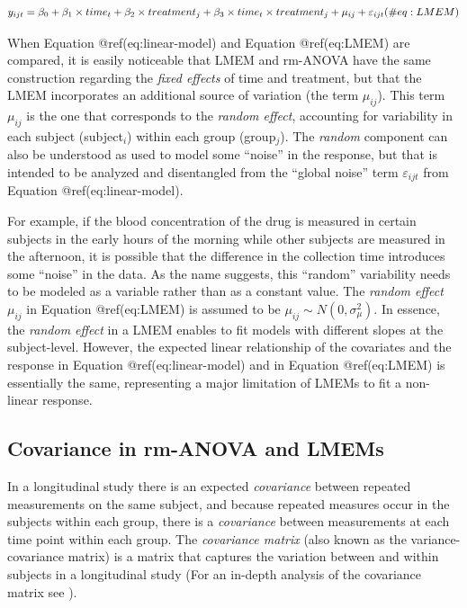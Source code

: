 \documentclass[Royal,times,sagev]{sagej}
\begin{document}
\begin{equation}
y_{ijt} = \beta_0+ \beta_1 \times time_{t} + \beta_2 \times treatment_{j} + \beta_3 \times time_{t}\times treatment_{j}+\mu_{ij} +\varepsilon_{ijt}\\ 
(\#eq:LMEM)
\end{equation}

When Equation @ref(eq:linear-model) and Equation @ref(eq:LMEM) are
compared, it is easily noticeable that LMEM and rm-ANOVA have the same
construction regarding the \emph{fixed effects} of time and treatment,
but that the LMEM incorporates an additional source of variation (the
term \(\mu_{ij}\)). This term \(\mu_{ij}\) is the one that corresponds
to the \emph{random effect}, accounting for variability in each subject
(subject\(_i\)) within each group (group\(_j\)). The \emph{random}
component can also be understood as used to model some ``noise'' in the
response, but that is intended to be analyzed and disentangled from the
``global noise'' term \(\varepsilon_{ijt}\) from Equation
@ref(eq:linear-model).

For example, if the blood concentration of the drug is measured in
certain subjects in the early hours of the morning while other subjects
are measured in the afternoon, it is possible that the difference in the
collection time introduces some ``noise'' in the data. As the name
suggests, this ``random'' variability needs to be modeled as a variable
rather than as a constant value. The \emph{random effect} \(\mu_{ij}\)
in Equation @ref(eq:LMEM) is assumed to be
\(\mu_{ij} \sim N(0,\sigma^2_\mu)\). In essence, the \emph{random
effect} in a LMEM enables to fit models with different slopes at the
subject-level\citep{pinheiro2006}. However, the expected linear
relationship of the covariates and the response in Equation
@ref(eq:linear-model) and in Equation @ref(eq:LMEM) is essentially the
same, representing a major limitation of LMEMs to fit a non-linear
response.

\hypertarget{covariance-in-rm-anova-and-lmems}{%
\subsection{Covariance in rm-ANOVA and
LMEMs}\label{covariance-in-rm-anova-and-lmems}}

In a longitudinal study there is an expected \emph{covariance} between
repeated measurements on the same subject, and because repeated measures
occur in the subjects within each group, there is a \emph{covariance}
between measurements at each time point within each group. The
\emph{covariance matrix} (also known as the variance-covariance matrix)
is a matrix that captures the variation between and within subjects in a
longitudinal study\citep{wolfinger1996} (For an in-depth analysis of the
covariance matrix see \citep{west2014, weiss2005}).
\end{document}

